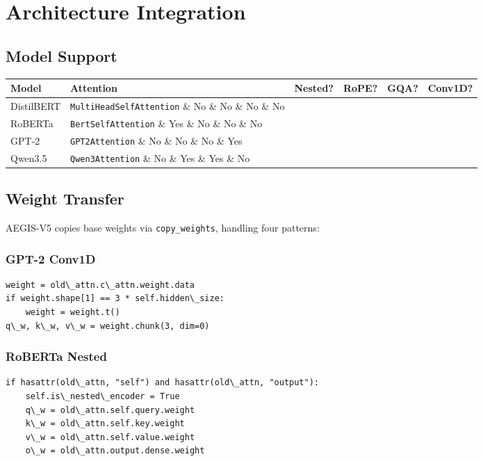 \section{Architecture Integration}

\subsection{Model Support}

\begin{table}[H]
\centering
\small
\begin{tabular}{llllll}
\toprule
\textbf{Model} & \textbf{Attention} & \textbf{Nested?} & \textbf{RoPE?} & \textbf{GQA?} & \textbf{Conv1D?} \\
\midrule
DistilBERT & \texttt{MultiHeadSelfAttention} \& No \& No \& No \& No \\
RoBERTa & \texttt{BertSelfAttention} \& Yes \& No \& No \& No \\
GPT-2 & \texttt{GPT2Attention} \& No \& No \& No \& Yes \\
Qwen3.5 & \texttt{Qwen3Attention} \& No \& Yes \& Yes \& No \\
\bottomrule
\end{tabular}
\end{table}

\subsection{Weight Transfer}

AEGIS-V5 copies base weights via \texttt{copy\_weights}, handling four patterns:

\subsubsection{GPT-2 Conv1D}

\begin{lstlisting}
weight = old\_attn.c\_attn.weight.data
if weight.shape[1] == 3 * self.hidden\_size:
    weight = weight.t()
q\_w, k\_w, v\_w = weight.chunk(3, dim=0)
\end{lstlisting}

\subsubsection{RoBERTa Nested}

\begin{lstlisting}
if hasattr(old\_attn, "self") and hasattr(old\_attn, "output"):
    self.is\_nested\_encoder = True
    q\_w = old\_attn.self.query.weight
    k\_w = old\_attn.self.key.weight
    v\_w = old\_attn.self.value.weight
    o\_w = old\_attn.output.dense.weight
\end{lstlisting}

